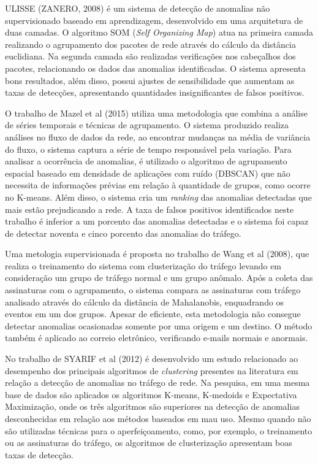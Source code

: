\documentclass[12pt,openright,oneside,a4paper,english,spanish,brazil]{unifil}
\begin{document}
\indent ULISSE (ZANERO, 2008) é um sistema de detecção de anomalias não supervisionado baseado em aprendizagem, desenvolvido em uma arquitetura de duas camadas. O algoritmo SOM (\textit{Self Organizing Map}) atua na primeira camada realizando o agrupamento dos pacotes de rede através do cálculo da distância euclidiana. Na segunda camada são realizadas verificações nos cabeçalhos dos pacotes, relacionando os dados das anomalias identificadas. O sistema apresenta bons resultados, além disso, possui ajustes de sensibilidade que aumentam as taxas de detecções, apresentando quantidades insignificantes de falsos positivos.

\indent O trabalho de Mazel et al (2015) utiliza uma metodologia que combina a análise de séries temporais e técnicas de agrupamento. O sistema produzido realiza análises no fluxo de dados da rede, ao encontrar mudanças na média de variância do fluxo, o sistema captura a série de tempo responsável pela variação. Para analisar a ocorrência de anomalias, é utilizado o algoritmo de agrupamento espacial baseado em densidade de aplicações com ruído (DBSCAN) que não necessita de informações prévias em relação à quantidade de grupos, como ocorre no K-means. Além disso, o sistema cria um \textit{ranking} das anomalias detectadas que mais estão prejudicando a rede. A taxa de falsos positivos identificados neste trabalho é inferior a um porcento das anomalias detectadas e o sistema foi capaz de detectar noventa e cinco porcento das anomalias do tráfego.

\indent Uma metologia supervisionada é proposta no trabalho de Wang et al (2008), que realiza o treinamento do sistema com clusterização do tráfego levando em consideração um grupo de tráfego normal e um grupo anômalo. Após a coleta das assinaturas com o agrupamento, o sistema compara as assinaturas com tráfego analisado através do cálculo da distância de Mahalanobis, enquadrando os eventos em um dos grupos. Apesar de eficiente, esta metodologia não consegue detectar anomalias ocasionadas somente por uma origem e um destino. O método também é aplicado ao correio eletrônico, verificando e-mails normais e anormais. 

\indent No trabalho de SYARIF et al (2012) é desenvolvido um estudo relacionado ao desempenho dos principais algoritmos de \textit{clustering} presentes na literatura em relação a detecção de anomalias no tráfego de rede. Na pesquisa, em uma mesma base de dados são aplicados os algoritmos K-means, K-medoids e Expectativa Maximização, onde os três algoritmos são superiores na detecção de anomalias desconhecidas em relação aos métodos baseados em mau uso. Mesmo quando não são utilizadas técnicas para o aperfeiçoamento, como, por exemplo, o treinamento ou as assinaturas do tráfego, os algoritmos de clusterização apresentam boas taxas de detecção.
\end{document}
